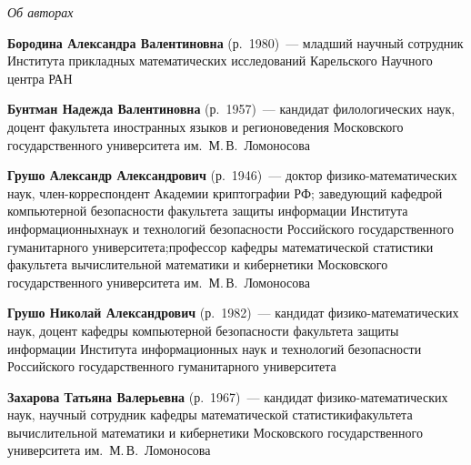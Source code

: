 \begin{center}\LARGE
\textit{Об авторах}
\end{center}

\thispagestyle{empty}



\vspace*{48pt}


\begin{multicols}{2}



\noindent 
\textbf{Бородина Александра Валентиновна} (р.\ 1980)~--- младший научный сотрудник
Института прикладных математических исследований Карельского Научного центра РАН

\vspace*{3pt}

\noindent
\textbf{Бунтман Надежда Валентиновна} (р.\ 1957)~--- кандидат филологических наук, 
доцент факультета иностранных языков и регионоведения Московского государственного университета им.~М.\,В.~Ломоносова

\vspace*{3pt}

\noindent
\textbf{Грушо Александр Александрович} (р.\ 1946)~--- доктор фи\-зи\-ко-математических наук, 
член-корреспондент Академии криптографии РФ; заведующий ка\-фед\-рой компьютерной безопасности факультета 
защиты информации Института информационных\linebreak наук и технологий безопасности Российского государственного 
гуманитарного университета;\linebreak профессор кафедры математической статистики факультета вычислительной математики 
и кибернетики Московского государственного университета им.~М.\,В.~Ломоносова

\vspace*{3pt}

\noindent
\textbf{Грушо Николай Александрович} (р.\ 1982)~--- кандидат физико-математических наук, 
доцент ка\-фед\-ры компьютерной безопасности факультета защиты информации Института информационных 
наук и технологий безопасности Российского государственного гуманитарного университета

\vspace*{3pt}

\noindent
\textbf{Захарова Татьяна Валерьевна} (р.\ 1967)~--- кандидат физико-математических наук, 
научный сотрудник кафедры математической статистики\linebreak факультета вычислительной математики и кибернетики
Московского государственного университета им.~М.\,В.~Ломоносова


\end{multicols}

